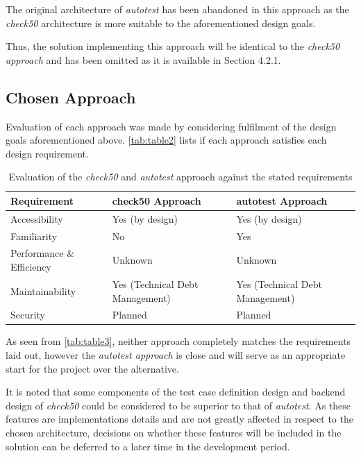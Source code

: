 \documentclass[hidelinks]{report}
\begin{document}
The original architecture of \textit{autotest} has been abandoned in this approach as the \textit{check50} architecture is more suitable to the aforementioned design goals.

Thus, the solution implementing this approach will be identical to the \textit{check50 approach} and has been omitted as it is available in Section 4.2.1.

\subsection{Chosen Approach}

Evaluation of each approach was made by considering fulfilment of the design goals aforementioned above. \autoref{tab:table2} lists if each approach satisfies each design requirement.

\begin{table}[h]
	\centering
	\begin{tabular}{lll}
		\toprule
		\textbf{Requirement} & \textbf{check50 Approach} & \textbf{autotest Approach} \\
		\midrule
		Accessibility    & Yes (by design) & Yes (by design) \\
		Familiarity      & No  & Yes \\
		Performance \& Efficiency & Unknown & Unknown \\
		Maintainability  & Yes (Technical Debt Management) & Yes (Technical Debt Management) \\
		Security 		 & Planned & Planned \\
		\bottomrule
	\end{tabular}
	\caption{Evaluation of the \textit{check50} and \textit{autotest} approach against the stated requirements}
	\label{tab:table3}
\end{table}

As seen from \autoref{tab:table3}, neither approach completely matches the requirements laid out, however the \textit{autotest approach} is close and will serve as an appropriate start for the project over the alternative.

It is noted that some components of the test case definition design and backend design of \textit{check50} could be considered to be superior to that of \textit{autotest}. As these features are implementations details and are not greatly affected in respect to the chosen architecture, decisions on whether these features will be included in the solution can be deferred to a later time in the development period.
\end{document}
